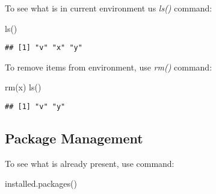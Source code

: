\documentclass[
]{article}
\newenvironment{Shaded}{\begin{snugshade}}{\end{snugshade}}
\newcommand{\FunctionTok}[1]{\textcolor[rgb]{0.00,0.00,0.00}{#1}}
\newcommand{\NormalTok}[1]{#1}
\begin{document}
To see what is in current environment us \emph{ls()} command:

\begin{Shaded}
\begin{Highlighting}[]
\FunctionTok{ls}\NormalTok{()}
\end{Highlighting}
\end{Shaded}

\begin{verbatim}
## [1] "v" "x" "y"
\end{verbatim}

To remove items from environment, use \emph{rm()} command:

\begin{Shaded}
\begin{Highlighting}[]
\FunctionTok{rm}\NormalTok{(x)}
\FunctionTok{ls}\NormalTok{()}
\end{Highlighting}
\end{Shaded}

\begin{verbatim}
## [1] "v" "y"
\end{verbatim}

\hypertarget{package-management}{%
\subsection{Package Management}\label{package-management}}

To see what is already present, use command:

\begin{Shaded}
\begin{Highlighting}[]
\FunctionTok{installed.packages}\NormalTok{()}
\end{Highlighting}
\end{Shaded}
\end{document}
